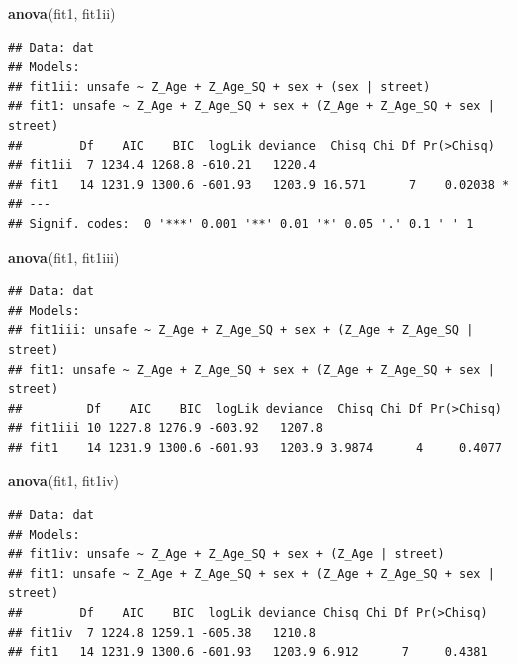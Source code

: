 \documentclass[]{article}
\newenvironment{Shaded}{\begin{snugshade}}{\end{snugshade}}
\newcommand{\KeywordTok}[1]{\textcolor[rgb]{0.13,0.29,0.53}{\textbf{#1}}}
\newcommand{\NormalTok}[1]{#1}
\begin{document}
\begin{Shaded}
\begin{Highlighting}[]
\KeywordTok{anova}\NormalTok{(fit1, fit1ii)}
\end{Highlighting}
\end{Shaded}

\begin{verbatim}
## Data: dat
## Models:
## fit1ii: unsafe ~ Z_Age + Z_Age_SQ + sex + (sex | street)
## fit1: unsafe ~ Z_Age + Z_Age_SQ + sex + (Z_Age + Z_Age_SQ + sex | street)
##        Df    AIC    BIC  logLik deviance  Chisq Chi Df Pr(>Chisq)  
## fit1ii  7 1234.4 1268.8 -610.21   1220.4                           
## fit1   14 1231.9 1300.6 -601.93   1203.9 16.571      7    0.02038 *
## ---
## Signif. codes:  0 '***' 0.001 '**' 0.01 '*' 0.05 '.' 0.1 ' ' 1
\end{verbatim}

\begin{Shaded}
\begin{Highlighting}[]
\KeywordTok{anova}\NormalTok{(fit1, fit1iii)}
\end{Highlighting}
\end{Shaded}

\begin{verbatim}
## Data: dat
## Models:
## fit1iii: unsafe ~ Z_Age + Z_Age_SQ + sex + (Z_Age + Z_Age_SQ | street)
## fit1: unsafe ~ Z_Age + Z_Age_SQ + sex + (Z_Age + Z_Age_SQ + sex | street)
##         Df    AIC    BIC  logLik deviance  Chisq Chi Df Pr(>Chisq)
## fit1iii 10 1227.8 1276.9 -603.92   1207.8                         
## fit1    14 1231.9 1300.6 -601.93   1203.9 3.9874      4     0.4077
\end{verbatim}

\begin{Shaded}
\begin{Highlighting}[]
\KeywordTok{anova}\NormalTok{(fit1, fit1iv)}
\end{Highlighting}
\end{Shaded}

\begin{verbatim}
## Data: dat
## Models:
## fit1iv: unsafe ~ Z_Age + Z_Age_SQ + sex + (Z_Age | street)
## fit1: unsafe ~ Z_Age + Z_Age_SQ + sex + (Z_Age + Z_Age_SQ + sex | street)
##        Df    AIC    BIC  logLik deviance Chisq Chi Df Pr(>Chisq)
## fit1iv  7 1224.8 1259.1 -605.38   1210.8                        
## fit1   14 1231.9 1300.6 -601.93   1203.9 6.912      7     0.4381
\end{verbatim}
\end{document}
